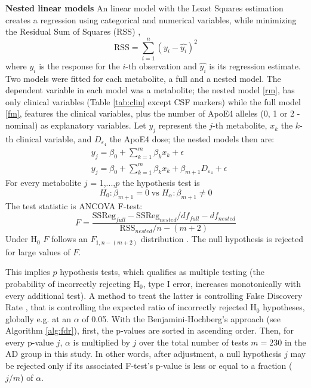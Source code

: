 \documentclass{amsart}
\begin{document}
\leavevmode\newline \textbf{Nested linear models}\hspace{.25cm}
An linear model with the Least Squares estimation creates a regression using categorical and numerical variables, while minimizing the Residual Sum of Squares (RSS) \cite{ott2015introduction}, 
$$\mathrm{RSS} = \sum_{i=1}^{n} (y_i - \hat{y_i})^2$$ where $y_i$ is the response for the $i$-th observation and $\hat{y_i}$ is its regression estimate. Two models were fitted for each metabolite, a full and a nested model. The dependent variable in each model was a metabolite; the nested model \eqref{rm}, has only clinical variables (Table \ref{tab:clin} except CSF markers) while the full model \eqref{fm}, features the clinical variables, plus the number of ApoE4 alleles (0, 1 or 2 -nominal) as explanatory variables. Let $y_j$ represent the $j$-th metabolite, $x_k$ the $k$-th clinical variable, and $D_{\varepsilon_4}$ the ApoE4 dose; the nested models then are:
\begin{align}
    & y_j = \beta_0 + \sum_{k=1}^m\beta_kx_k +\epsilon \label{rm} \\
    & y_j = \beta_0 + \sum_{k=1}^m\beta_kx_k + \beta_{m+1}D_{\varepsilon_4} + \epsilon \label{fm}
\end{align}
For every metabolite $j$ = 1,...,$p$ the hypothesis test is 
\[H_0: \beta_{m+1} = 0 \; \mathrm{vs} \; H_\alpha: \beta_{m+1} \neq 0\]
The test statistic is ANCOVA F-test:
\[ F = \frac{\mathrm{SSReg}_{full}-\mathrm{SSReg}_{nested}/df_{full}-df_{nested}}{\mathrm{RSS}_{nested}/n-(m+2)}\]
Under H$_0$ $F$ follows an $F_{1, n-(m+2)}$ distribution \cite{ott2015introduction}. The null hypothesis is rejected for large values of $F$.

This implies $p$ hypothesis tests, which qualifies as multiple testing (the probability of incorrectly rejecting H$_0$, type I error, increases monotonically with every additional test). A method to treat the latter is controlling False Discovery Rate \cite{Benjamini1995ControllingTesting}, that is controlling the expected ratio of incorrectly rejected H$_0$ hypotheses, globally e.g. at an $\alpha$ of 0.05. With the Benjamini-Hochberg's approach (see Algorithm \ref{alg:fdr}), first, the p-values are sorted in ascending order. Then, for every p-value $j$, $\alpha$ is multiplied by $j$ over the total number of tests \cite{Benjamini1995ControllingTesting} $m=230$ in the AD group in this study. In other words, after adjustment, a null hypothesis $j$ may be rejected only if its associated F-test's p-value is less or equal to a fraction ($j/m$) of $\alpha$.
\end{document}
